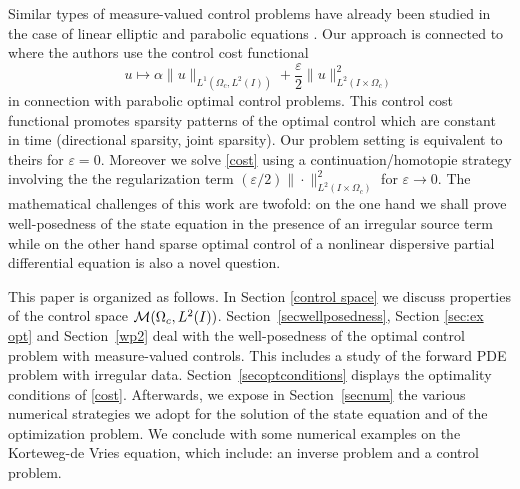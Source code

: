 Similar types of measure-valued control problems have already been studied in the case of linear elliptic and parabolic equations \cite{pieper2013priori,clason2011duality,casas2012approximation,casas2013parabolic,ClasonKunisch:2011b,CasasZuazua13,CasasVexlerZuazua13,CasasKunisch15}. Our approach is connected to \cite{herzog2012directional} where the authors use the control cost functional 
\[
u\mapsto\alpha \|u\|_{L^1(\Omega_c,L^2(I))}+\frac \varepsilon 2 \|u\|_{L^2(I\times \Omega_c)}^2
\]
in connection with parabolic optimal control problems. This control cost functional promotes sparsity patterns of the optimal control which are constant in time (directional sparsity, joint sparsity). Our problem setting is equivalent to theirs for $\varepsilon=0$. Moreover we solve \eqref{cost} using a continuation/homotopie strategy involving the the regularization term $(\varepsilon/2)\|\cdot\|_{L^2(I\times \Omega_c)}^2$ for $\varepsilon\rightarrow 0$.
The mathematical challenges of this work are twofold: on the one hand we shall prove well-posedness of the state equation in the presence of an irregular source term while on the other hand sparse optimal control of a nonlinear dispersive partial differential equation is also a novel question. %

This paper is organized as follows. In Section \ref{control space} we discuss properties of the control space $\mathcal{M}(\Omega_c, L^{2}(I))$. Section~\ref{secwellposedness}, Section \ref{sec:ex opt} and Section~\ref{wp2} deal with the well-posedness of the optimal control problem with measure-valued controls. This includes a study of the forward PDE problem with irregular data. Section~\ref{secoptconditions} displays the optimality conditions of \eqref{cost}. Afterwards, we expose in Section~\ref{secnum} the various numerical strategies we adopt for the solution of the state equation and  of the optimization problem. We conclude with some numerical examples on the Korteweg-de Vries equation, which include: an inverse problem and a control problem.

